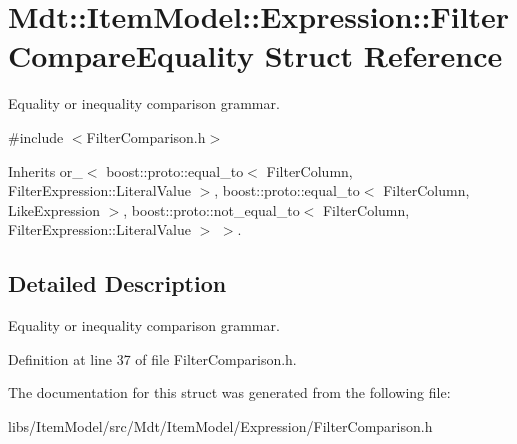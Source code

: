 \hypertarget{struct_mdt_1_1_item_model_1_1_expression_1_1_filter_compare_equality}{}\section{Mdt\+:\+:Item\+Model\+:\+:Expression\+:\+:Filter\+Compare\+Equality Struct Reference}
\label{struct_mdt_1_1_item_model_1_1_expression_1_1_filter_compare_equality}


Equality or inequality comparison grammar.  




{\ttfamily \#include $<$Filter\+Comparison.\+h$>$}



Inherits or\+\_\+$<$ boost\+::proto\+::equal\+\_\+to$<$ Filter\+Column, Filter\+Expression\+::\+Literal\+Value $>$, boost\+::proto\+::equal\+\_\+to$<$ Filter\+Column, Like\+Expression $>$, boost\+::proto\+::not\+\_\+equal\+\_\+to$<$ Filter\+Column, Filter\+Expression\+::\+Literal\+Value $>$ $>$.



\subsection{Detailed Description}
Equality or inequality comparison grammar. 

Definition at line 37 of file Filter\+Comparison.\+h.



The documentation for this struct was generated from the following file\+:\begin{DoxyCompactItemize}
\item 
libs/\+Item\+Model/src/\+Mdt/\+Item\+Model/\+Expression/Filter\+Comparison.\+h\end{DoxyCompactItemize}
